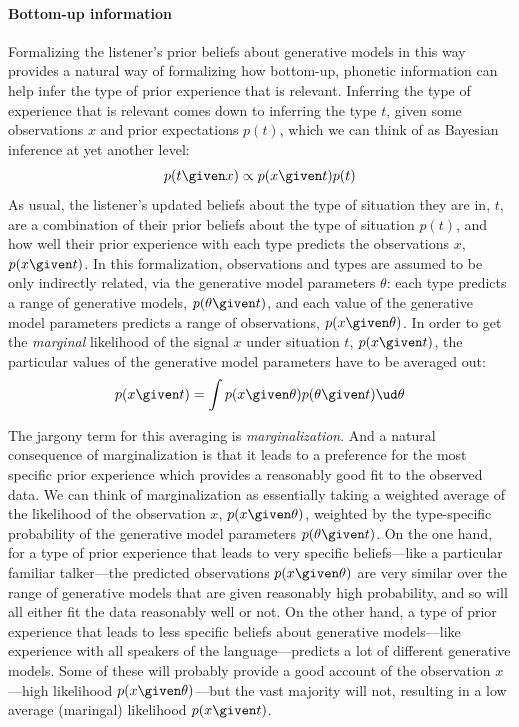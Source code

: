 \paragraph{Bottom-up information}
\label{sec:bott-up-inform}

Formalizing the listener's prior beliefs about generative models in this way provides a natural way of formalizing how bottom-up, phonetic information can help infer the type of prior experience that is relevant.  Inferring the type of experience that is relevant comes down to inferring the type $t$, given some observations $x$ and prior expectations $p(t)$, which we can think of as Bayesian inference at yet another level: 
\begin{equation}
  \label{eq:33}
  p(t \given x) \propto p(x \given t) p(t)
\end{equation}
As usual, the listener's updated beliefs about the type of situation they are in, $t$, are a combination of their prior beliefs about the type of situation $p(t)$, and how well their prior experience with each type predicts the observations $x$, $p(x\given t)$.  In this formalization, observations and types are assumed to be only indirectly related, via the generative model parameters $\theta$: each type predicts a range of generative models, $p(\theta \given t)$, and each value of the generative model parameters predicts a range of observations, $p(x \given \theta)$.  In order to get the \emph{marginal} likelihood of the signal $x$ under situation $t$, $p(x\given t)$, the particular values of the generative model parameters have to be averaged out:
\begin{equation}
  \label{eq:34}
  p(x \given t) = \int p(x \given \theta) p(\theta \given t) \ud \theta
\end{equation}

The jargony term for this averaging is \emph{marginalization}. And a natural consequence of marginalization is that it leads to a preference for the most specific prior experience which provides a reasonably good fit to the observed data.  We can think of marginalization as essentially taking a weighted average of the likelihood of the observation $x$, $p(x \given \theta)$, weighted by the type-specific probability of the generative model parameters $p(\theta \given t)$.  On the one hand, for a type of prior experience that leads to very specific beliefs---like a particular familiar talker---the predicted observations $p(x\given \theta)$ are very similar over the range of generative models that are given reasonably high probability, and so will all either fit the data reasonably well or not.  On the other hand, a type of prior experience that leads to less specific beliefs about generative models---like experience with all speakers of the language---predicts a lot of different generative models.  Some of these will probably provide a good account of the observation $x$---high likelihood $p(x \given \theta)$---but the vast majority will not, resulting in a low average (maringal) likelihood $p(x \given t)$. 

